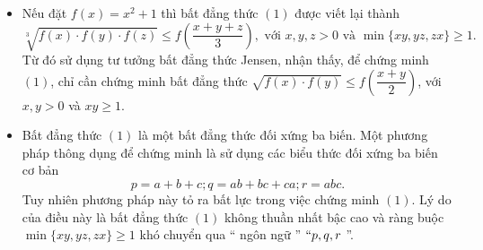 \begin{bt}
{		\begin{nx}\hfill
			\begin{itemize}
				\item Nếu đặt $f(x)=x^2+1$ thì bất đẳng thức $(1)$ được viết lại thành $$\sqrt[3]{f(x)\cdot f(y)\cdot f(z)} \leq f\left( \dfrac{x+y+z}{3}\right), \text{ với } x,y,z >0 \text{ và } \min \{xy, yz, zx\} \geq 1. $$ Từ đó sử dụng tư tưởng bất đẳng thức Jensen, nhận thấy, để chứng minh $(1)$, chỉ cần chứng minh bất đẳng thức $\sqrt{f(x)\cdot f(y)} \leq f\left( \dfrac{x+y}{2}\right)$, với $x,y >0 $ và $xy \geq 1.$
				\item  Bất đẳng thức $(1)$ là một bất đẳng thức đối xứng ba biến. Một phương pháp thông dụng để chứng minh là sử dụng các biểu thức đối xứng ba biến cơ bản 
				$$p =a+b+c; q=ab+bc+ca; r =abc.$$
				Tuy nhiên phương pháp này tỏ ra bất lực trong việc chứng minh $(1)$. Lý do của điều này là bất đẳng thức $(1)$ không thuần nhất bậc cao và ràng buộc $\min \{xy, yz, zx\} \geq 1$ khó chuyển qua `` ngôn ngữ ''  $`` p,q,r$ ''.
			\end{itemize}
		\end{nx}
	}
\end{bt}
